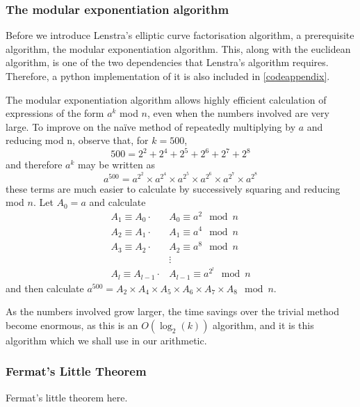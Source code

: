 \subsubsection{The modular exponentiation algorithm}
Before we introduce Lenstra's elliptic curve factorisation algorithm, a prerequisite algorithm, the modular exponentiation algorithm.
This, along with the euclidean algorithm, is one of the two dependencies that Lenstra's algorithm requires.
Therefore, a python implementation of it is also included in \cref{codeappendix}.
\begin{definition}
	The modular exponentiation algorithm allows highly efficient calculation of expressions of the form $a^k$ mod $n$, even when the numbers involved are very large.
	To improve on the naïve method of repeatedly multiplying by $a$ and reducing mod n, observe that, for $k=500$,
$$500=2^2+2^4+2^5+2^6+2^7+2^8$$
and therefore $a^k$ may be written as
$$a^{500} = a^{2^{2}} \times a^{2^{4}} \times a^{2^{5}} \times a^{2^{6}} \times a^{2^{7}} \times a^{2^{8}}$$
these terms are much easier to calculate by successively squaring and reducing mod $n$.
Let $A_0 = a$ and calculate
\begin{align*}
	A_1\equiv A_0\cdot &A_0 \equiv a^2 \mod n\\
	A_2\equiv A_1\cdot &A_1 \equiv a^4 \mod n\\
	A_3\equiv A_2\cdot &A_2 \equiv a^8 \mod n\\
	&\vdots\\
	A_l\equiv A_{l-1}\cdot &A_{l-1} \equiv a^{2^{l}} \mod n
\end{align*}
and then calculate $a^{500} = A_2 \times A_4 \times A_5 \times A_6 \times A_7 \times A_8 \mod n$.
\end{definition}
As the numbers involved grow larger, the time savings over the trivial method become enormous, as this is an $O(\log_2(k))$ algorithm, and it is this algorithm which we shall use in our arithmetic.

\subsubsection{Fermat's Little Theorem}
Fermat's little theorem here.

